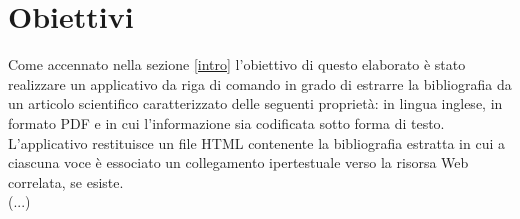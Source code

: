 \section{Obiettivi} \label{obiettivi}
Come accennato nella sezione \ref{intro} l'obiettivo di questo elaborato è stato realizzare un applicativo da riga di comando in grado di estrarre la bibliografia da un articolo scientifico caratterizzato delle seguenti proprietà: in lingua inglese, in formato PDF e in cui l'informazione sia codificata sotto forma di testo.
\\ 
L'applicativo restituisce un file HTML contenente la bibliografia estratta in cui a ciascuna voce è essociato un collegamento ipertestuale verso la risorsa Web correlata, se esiste.
\\
(...)
